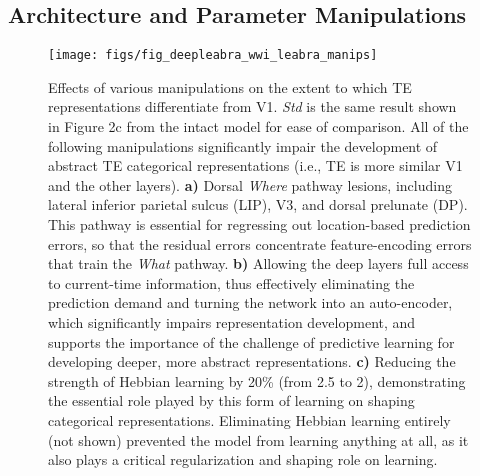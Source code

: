 \documentclass[11pt,twoside]{article}
\newif\myifpdf
\begin{document}
\subsection{Architecture and Parameter Manipulations}

\begin{figure}
  \centering\texttt{[image: figs/fig\_deepleabra\_wwi\_leabra\_manips]}
  \caption{Effects of various manipulations on the extent to which TE representations differentiate from V1.  \emph{Std} is the same result shown in Figure 2c from the intact model for ease of comparison.  All of the following  manipulations significantly impair the development of abstract TE categorical representations (i.e., TE is more similar V1 and the other layers).  {\bf a)} Dorsal \emph{Where} pathway lesions, including lateral inferior parietal sulcus (LIP), V3, and dorsal prelunate (DP).  This pathway is essential for regressing out location-based prediction errors, so that the residual errors concentrate feature-encoding errors that train the \emph{What} pathway.  {\bf b)} Allowing the deep layers full access to current-time information, thus effectively eliminating the prediction demand and turning the network into an auto-encoder, which significantly impairs representation development, and supports the importance of the challenge of predictive learning for developing deeper, more abstract representations.  {\bf c)} Reducing the strength of Hebbian learning by 20\% (from 2.5 to 2), demonstrating the essential role played by this form of learning on shaping categorical representations.  Eliminating Hebbian learning entirely (not shown) prevented the model from learning anything at all, as it also plays a critical regularization and shaping role on learning.}
  \label{fig.manips}
\end{figure}
\end{document}
